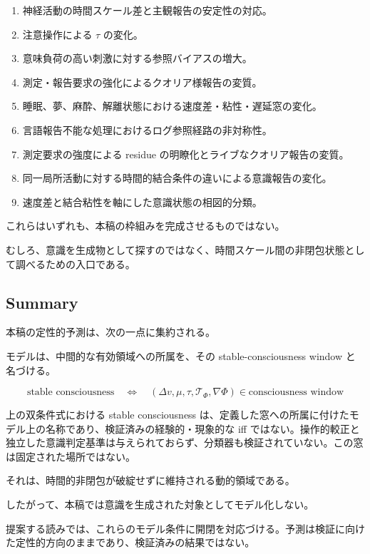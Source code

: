 \begin{enumerate}
\item 神経活動の時間スケール差と主観報告の安定性の対応。
\item 注意操作による $\tau$ の変化。
\item 意味負荷の高い刺激に対する参照バイアスの増大。
\item 測定・報告要求の強化によるクオリア様報告の変質。
\item 睡眠、夢、麻酔、解離状態における速度差・粘性・遅延窓の変化。
\item 言語報告不能な処理におけるログ参照経路の非対称性。
\item 測定要求の強度による residue の明瞭化とライブなクオリア報告の変質。
\item 同一局所活動に対する時間的結合条件の違いによる意識報告の変化。
\item 速度差と結合粘性を軸にした意識状態の相図的分類。
\end{enumerate}

これらはいずれも、本稿の枠組みを完成させるものではない。

むしろ、意識を生成物として探すのではなく、時間スケール間の非閉包状態として調べるための入口である。

\subsection{Summary}

本稿の定性的予測は、次の一点に集約される。

モデルは、中間的な有効領域への所属を、その stable-consciousness window と名づける。

\begin{equation}
\text{stable consciousness}
\quad \Leftrightarrow \quad
(\Delta v,\mu,\tau,\mathcal{T}_{\Phi},\nabla\Phi)
\in
\text{consciousness window}
\end{equation}

上の双条件式における stable consciousness は、定義した窓への所属に付けたモデル上の名称であり、検証済みの経験的・現象的な iff ではない。操作的較正と独立した意識判定基準は与えられておらず、分類器も検証されていない。この窓は固定された場所ではない。

それは、時間的非閉包が破綻せずに維持される動的領域である。

したがって、本稿では意識を生成された対象としてモデル化しない。

提案する読みでは、これらのモデル条件に開閉を対応づける。予測は検証に向けた定性的方向のままであり、検証済みの結果ではない。
